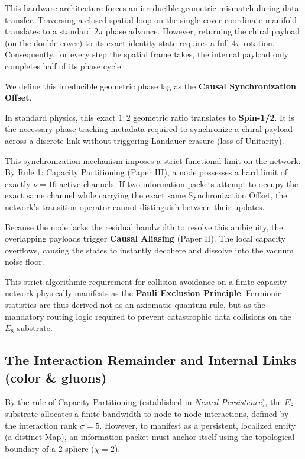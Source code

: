 This hardware architecture forces an irreducible geometric mismatch during data transfer. Traversing a closed spatial loop on the single-cover coordinate manifold translates to a standard $2\pi$ phase advance. However, returning the chiral payload (on the double-cover) to its exact identity state requires a full $4\pi$ rotation. Consequently, for every step the spatial frame takes, the internal payload only completes half of its phase cycle. 

We define this irreducible geometric phase lag as the \textbf{Causal Synchronization Offset}. 

In standard physics, this exact $1:2$ geometric ratio translates to \textbf{Spin-1/2}. It is the necessary phase-tracking metadata required to synchronize a chiral payload across a discrete link without triggering Landauer erasure (loss of Unitarity).

This synchronization mechanism imposes a strict functional limit on the network. By Rule 1: Capacity Partitioning (Paper III), a node possesses a hard limit of exactly $\nu=16$ active channels. If two information packets attempt to occupy the exact same channel while carrying the exact same Synchronization Offset, the network's transition operator cannot distinguish between their updates. 

Because the node lacks the residual bandwidth to resolve this ambiguity, the overlapping payloads trigger \textbf{Causal Aliasing} (Paper II). The local capacity overflows, causing the states to instantly decohere and dissolve into the vacuum noise floor. 

This strict algorithmic requirement for collision avoidance on a finite-capacity network physically manifests as the \textbf{Pauli Exclusion Principle}. Fermionic statistics are thus derived not as an axiomatic quantum rule, but as the mandatory routing logic required to prevent catastrophic data collisions on the $E_8$ substrate.


\subsection{The Interaction Remainder and Internal Links (color \& gluons)}

By the rule of Capacity Partitioning (established in \textit{Nested Persistence}\cite{meyer_ienested_2026}), the $E_8$ substrate allocates a finite bandwidth to node-to-node interactions, defined by the interaction rank $\sigma = 5$. However, to manifest as a persistent, localized entity (a distinct Map), an information packet must anchor itself using the topological boundary of a 2-sphere ($\chi = 2$). 

